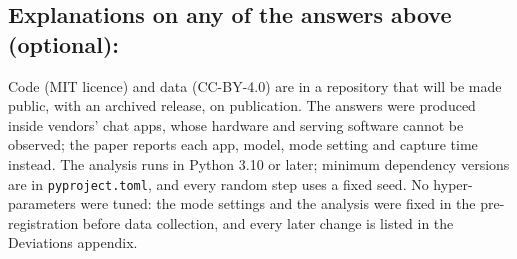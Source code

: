 \documentclass[manuscript, screen, review]{jair}
\begin{document}
\subsection*{Explanations on any of the answers above (optional):}

Code (MIT licence) and data (CC-BY-4.0) are in a repository that will be made public, with
an archived release, on publication. The answers were produced inside vendors' chat apps,
whose hardware and serving software cannot be observed; the paper reports each app, model,
mode setting and capture time instead. The analysis runs in Python 3.10 or later; minimum
dependency versions are in \texttt{pyproject.toml}, and every random step uses a fixed seed.
No hyper-parameters were tuned: the mode settings and the analysis were fixed in the
pre-registration before data collection, and every later change is listed in the Deviations
appendix.
\end{document}
